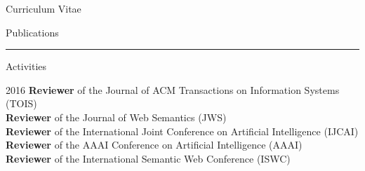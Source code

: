 \begin{cv}{\centerline{\LARGE Curriculum Vitae}}
\begin{cvlist}{Publications}
\begin{list}{}{\leftmargin=-1em}
    \end{list}
  \end{cvlist}

  \hrule
  

\setlength{\cvlabelwidth}{47mm} 
  \begin{cvlist}{Activities}
  \item[2016] \textbf{Reviewer} of the Journal of ACM Transactions on Information Systems (TOIS)\\ 
  \textbf{Reviewer} of the Journal of Web Semantics (JWS)\\ 
  \textbf{Reviewer} of the International Joint Conference on Artificial Intelligence (IJCAI)\\
  \textbf{Reviewer} of the AAAI Conference on Artificial Intelligence (AAAI) \\
  \textbf{Reviewer} of the International Semantic Web Conference (ISWC) \\ 

\end{cvlist}
\end{cv}
